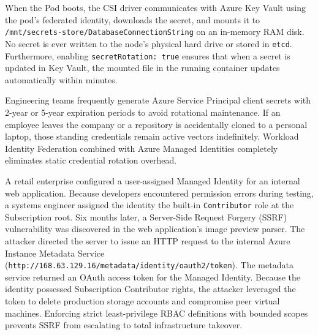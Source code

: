 When the Pod boots, the CSI driver communicates with Azure Key Vault using the pod's federated identity, downloads the secret, and mounts it to \texttt{/mnt/secrets-store/DatabaseConnectionString} on an in-memory RAM disk. No secret is ever written to the node's physical hard drive or stored in \texttt{etcd}. Furthermore, enabling \texttt{secretRotation: true} ensures that when a secret is updated in Key Vault, the mounted file in the running container updates automatically within minutes.

\begin{commonmistakebox}
Engineering teams frequently generate Azure Service Principal client secrets with 2-year or 5-year expiration periods to avoid rotational maintenance. If an employee leaves the company or a repository is accidentally cloned to a personal laptop, those standing credentials remain active vectors indefinitely. Workload Identity Federation combined with Azure Managed Identities completely eliminates static credential rotation overhead.
\end{commonmistakebox}

\begin{realworldbox}
A retail enterprise configured a user-assigned Managed Identity for an internal web application. Because developers encountered permission errors during testing, a systems engineer assigned the identity the built-in \texttt{Contributor} role at the Subscription root. Six months later, a Server-Side Request Forgery (SSRF) vulnerability was discovered in the web application's image preview parser. The attacker directed the server to issue an HTTP request to the internal Azure Instance Metadata Service (\texttt{http://168.63.129.16/metadata/identity/oauth2/token}). The metadata service returned an OAuth access token for the Managed Identity. Because the identity possessed Subscription Contributor rights, the attacker leveraged the token to delete production storage accounts and compromise peer virtual machines. Enforcing strict least-privilege RBAC definitions with bounded scopes prevents SSRF from escalating to total infrastructure takeover.
\end{realworldbox}


